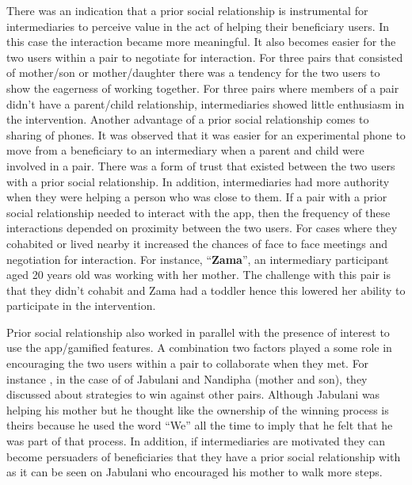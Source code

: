 There was an indication that a prior social relationship is instrumental for intermediaries to perceive value in the act of helping their beneficiary users. In this case the interaction became more meaningful. It also becomes easier for the two users within a pair to negotiate for interaction. For three pairs that consisted of mother/son or mother/daughter there was a tendency for the two users to show the eagerness of working together. For three pairs where members of a pair didn't  have a parent/child relationship, intermediaries showed little enthusiasm in the intervention. Another advantage of a prior social relationship comes to sharing of phones. It was observed that it was easier for an experimental phone to move from a beneficiary to an intermediary when a parent and child were involved in a pair. There was a form of trust that existed between the two users with a prior social relationship. In addition, intermediaries had more authority when they were helping a person who was close to them. If a pair with a prior social relationship needed to interact with the app, then the frequency of these interactions depended on proximity between the two users. For cases where they cohabited or lived nearby it increased the chances of face to face meetings and negotiation for interaction. For instance, ``\textbf{Zama}'', an intermediary participant aged 20 years old was working with her mother. The challenge with this pair is that they didn't cohabit and Zama had a toddler hence this lowered her ability to participate in the intervention.  

Prior social relationship also worked in parallel with the presence of interest to use the app/gamified features. A combination two factors played a some role in  encouraging the two users within a pair to collaborate when they met. For instance , in the case of of Jabulani and Nandipha (mother and son), they discussed about strategies to win against other pairs. Although Jabulani was helping his mother but he thought like the ownership of the winning process is theirs because he used the word ``We'' all the time to imply that he felt that he was part of that process. In addition, if intermediaries are motivated they can become persuaders of beneficiaries that they have a prior social relationship with as it can be seen on Jabulani who encouraged his mother to walk more steps.

